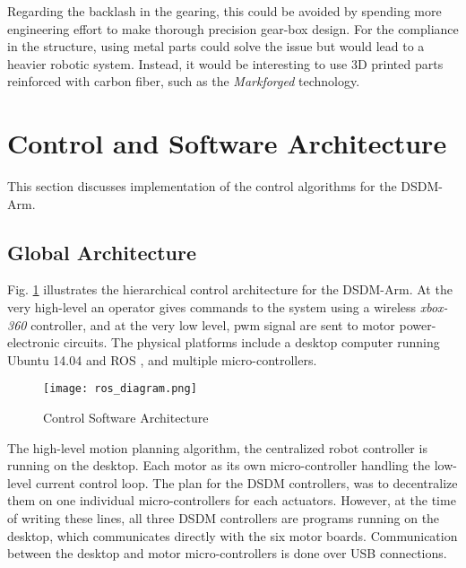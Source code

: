 Regarding the backlash in the gearing, this could be avoided by spending more engineering effort to make thorough precision gear-box design. For the compliance in the structure, using metal parts could solve the issue but would lead to a heavier robotic system. Instead, it would be interesting to use 3D printed parts reinforced with carbon fiber, such as the \textit{Markforged} technology. 




\newpage
\newpage

\section{Control and Software Architecture}
\label{sec:ControlSoftwareArchitecture}

This section discusses implementation of the control algorithms for the DSDM-Arm. 

\subsection{Global Architecture}

Fig. \ref{fig:archi_diagram} illustrates the hierarchical control architecture for the DSDM-Arm. At the very high-level an operator gives commands to the system using a wireless \textit{xbox-360} controller, and at the very low level, pwm signal are sent to motor power-electronic circuits. The physical platforms include a desktop computer running Ubuntu 14.04 and ROS \cite{quigley_ros:_2009}, and multiple micro-controllers. 

\begin{figure}[H]
	\centering
		\texttt{[image: ros\_diagram.png]}
	\caption{Control Software Architecture}
	\label{fig:archi_diagram}
\end{figure}

The high-level motion planning algorithm, the centralized robot controller is running on the desktop. Each motor as its own micro-controller handling the low-level current control loop. The plan for the DSDM controllers, was to decentralize them on one individual micro-controllers for each actuators. However, at the time of writing these lines, all three DSDM controllers are programs running on the desktop, which communicates directly with the six motor boards. Communication between the desktop and motor micro-controllers is done over USB connections.

